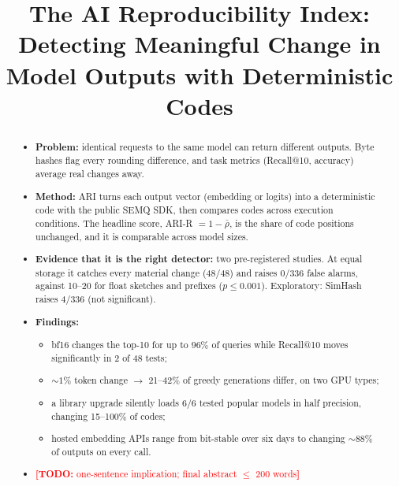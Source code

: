 \documentclass{article}
\title{The AI Reproducibility Index: Detecting Meaningful Change in Model Outputs with Deterministic Codes \todo{title}}
\author{\todo{authors and affiliations}}
\newcommand{\todo}[1]{\textcolor{red}{\textbf{[TODO:} #1\textbf{]}}}
\begin{document}
\maketitle

\begin{abstract}
\begin{itemize}
  \item \textbf{Problem:} identical requests to the same model can return different outputs. Byte hashes flag every rounding difference, and task metrics (Recall@10, accuracy) average real changes away.
  \item \textbf{Method:} ARI turns each output vector (embedding or logits) into a deterministic code with the public SEMQ SDK, then compares codes across execution conditions. The headline score, ARI-R $=1-\bar\rho$, is the share of code positions unchanged, and it is comparable across model sizes.
  \item \textbf{Evidence that it is the right detector:} two pre-registered studies. At equal storage it catches every material change (48/48) and raises 0/336 false alarms, against 10--20 for float sketches and prefixes ($p\le 0.001$). Exploratory: SimHash raises 4/336 (not significant).
  \item \textbf{Findings:}
  \begin{itemize}
    \item bf16 changes the top-10 for up to 96\% of queries while Recall@10 moves significantly in 2 of 48 tests;
    \item ${\sim}1\%$ token change $\rightarrow$ 21--42\% of greedy generations differ, on two GPU types;
    \item a library upgrade silently loads 6/6 tested popular models in half precision, changing 15--100\% of codes;
    \item hosted embedding APIs range from bit-stable over six days to changing ${\sim}88\%$ of outputs on every call.
  \end{itemize}
  \item \todo{one-sentence implication; final abstract $\le$ 200 words}
\end{itemize}
\end{abstract}

\end{document}
